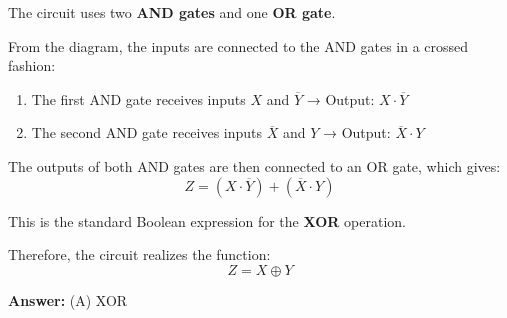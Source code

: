 \documentclass[a4paper,12pt]{article}
\begin{document}
The circuit uses two \textbf{AND gates} and one \textbf{OR gate}.

\vspace{0.5em}

From the diagram, the inputs are connected to the AND gates in a crossed fashion:

\begin{enumerate}
  \item The first AND gate receives inputs \( X \) and \( \overline{Y} \) → Output: \( X \cdot \overline{Y} \)
  \item The second AND gate receives inputs \( \overline{X} \) and \( Y \) → Output: \( \overline{X} \cdot Y \)
\end{enumerate}

The outputs of both AND gates are then connected to an OR gate, which gives:
\[
Z = (X \cdot \overline{Y}) + (\overline{X} \cdot Y)
\]

This is the standard Boolean expression for the \textbf{XOR} operation.

\vspace{1em}

\noindent Therefore, the circuit realizes the function:
\[
Z = X \oplus Y
\]

\vspace{0.3cm}
\noindent\textbf{Answer:} (A) XOR
\end{document}

